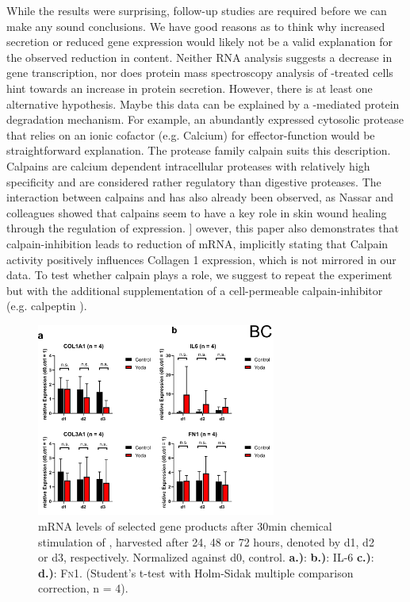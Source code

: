 While the results were surprising, follow-up studies are required before we can make any sound conclusions. We have good reasons as to think why increased secretion or reduced gene expression would likely not be a valid explanation for the observed reduction in \colone{} content. Neither RNA analysis suggests a decrease in gene transcription, nor does protein mass spectroscopy analysis of \Yoda{}-treated cells hint towards an increase in protein secretion. However, there is at least one alternative hypothesis. Maybe this data can be explained by a \Piezo{}-mediated protein degradation mechanism. For example, an abundantly expressed cytosolic protease that relies on an ionic cofactor (e.g. Calcium) for effector-function would be straightforward explanation. The protease family calpain suits this description. \cite{Goll2003} Calpains are calcium dependent intracellular proteases with relatively high specificity and are considered rather regulatory than digestive proteases. The interaction between calpains and \colone has also already been observed, as Nassar and colleagues showed that calpains seem to have a key role in skin wound healing through the regulation of \colone{} expression. \cite{Nassar2012}] owever, this paper also demonstrates that calpain-inhibition leads to reduction of \colone{} mRNA, implicitly stating that Calpain activity positively influences Collagen 1 expression, which is not mirrored in our data. To test whether calpain plays a role, we suggest to repeat the experiment but with the additional supplementation of a cell-permeable calpain-inhibitor (e.g. calpeptin \cite{Scoenwaelder1999}).

\begin{figure}[ht]
\centering
\includegraphics[width = 0.7\textwidth]{NormalYodaExp_PCR.png}
\caption{mRNA levels of selected gene products after 30min chemical stimulation of \Piezo{}, harvested after 24, 48 or 72 hours, denoted by d1, d2 or d3, respectively. Normalized against d0, control.\hfill \newline
\textbf{a.)}: \colone{}
\textbf{b.)}: IL-6
\textbf{c.)}: \colthree{}
\textbf{d.)}: \textsc{Fn}1. 
(Student's t-test with Holm-Sidak multiple comparison correction, n = 4). 
}
\label{fig:Yoda_Norm_PCR}
\end{figure}


